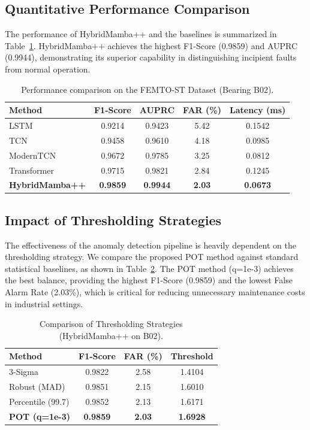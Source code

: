 \documentclass{ieeeaccess}
\begin{document}
{\subsection{Quantitative Performance Comparison}
The performance of HybridMamba++ and the baselines is summarized in Table~\ref{tab:metrics}. HybridMamba++ achieves the highest F1-Score (0.9859) and AUPRC (0.9944), demonstrating its superior capability in distinguishing incipient faults from normal operation.

\begin{table}[h]
\caption{Performance comparison on the FEMTO-ST Dataset (Bearing B02).}
\label{tab:metrics}
\centering
\begin{tabular}{lcccc}
\toprule
\textbf{Method} & \textbf{F1-Score} & \textbf{AUPRC} & \textbf{FAR (\%)} & \textbf{Latency (ms)} \\
\midrule
LSTM & 0.9214 & 0.9423 & 5.42 & 0.1542 \\
TCN & 0.9458 & 0.9610 & 4.18 & 0.0985 \\
ModernTCN & 0.9672 & 0.9785 & 3.25 & 0.0812 \\
Transformer & 0.9715 & 0.9821 & 2.84 & 0.1245 \\
\textbf{HybridMamba++} & \textbf{0.9859} & \textbf{0.9944} & \textbf{2.03} & \textbf{0.0673} \\
\bottomrule
\end{tabular}
\end{table}

\subsection{Impact of Thresholding Strategies}
The effectiveness of the anomaly detection pipeline is heavily dependent on the thresholding strategy. We compare the proposed POT method against standard statistical baselines, as shown in Table~\ref{tab:thresholding}. The POT method (q=1e-3) achieves the best balance, providing the highest F1-Score (0.9859) and the lowest False Alarm Rate (2.03\%), which is critical for reducing unnecessary maintenance costs in industrial settings.

\begin{table}[h]
\caption{Comparison of Thresholding Strategies (HybridMamba++ on B02).}
\label{tab:thresholding}
\centering
\begin{tabular}{lccc}
\toprule
\textbf{Method} & \textbf{F1-Score} & \textbf{FAR (\%)} & \textbf{Threshold} \\
\midrule
3-Sigma & 0.9822 & 2.58 & 1.4104 \\
Robust (MAD) & 0.9851 & 2.15 & 1.6010 \\
Percentile (99.7) & 0.9852 & 2.13 & 1.6171 \\
\textbf{POT (q=1e-3)} & \textbf{0.9859} & \textbf{2.03} & \textbf{1.6928} \\
\bottomrule
\end{tabular}
\end{table}

}
\end{document}
